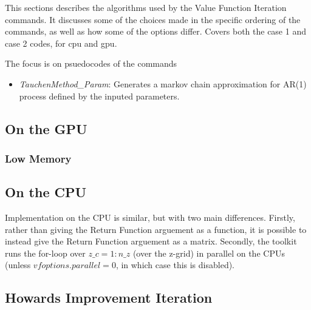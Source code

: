 This sections describes the algorithms used by the Value Function Iteration commands. It discusses some of the choices made in the
specific ordering of the commands, as well as how some of the options differ. Covers both the case 1 and case 2 codes, for cpu and gpu.

The focus is on psuedocodes of the commands
\begin{itemize}
 \item \textit{TauchenMethod\_{}Param}: Generates a markov chain approximation for AR(1) process defined by the inputed parameters.
\end{itemize}

\subsection{On the GPU}



\subsubsection{Low Memory}

\subsection{On the CPU}
Implementation on the CPU is similar, but with two main differences. Firstly, rather than giving the Return Function arguement as a
function, it is possible to instead give the Return Function arguement as a matrix. Secondly, the toolkit runs the for-loop over 
$z\_{}c=1:n\_{}z$ (over the z-grid) in parallel on the CPUs (unless $vfoptions.parallel=0$, in which case this is disabled).

\subsection{Howards Improvement Iteration}




